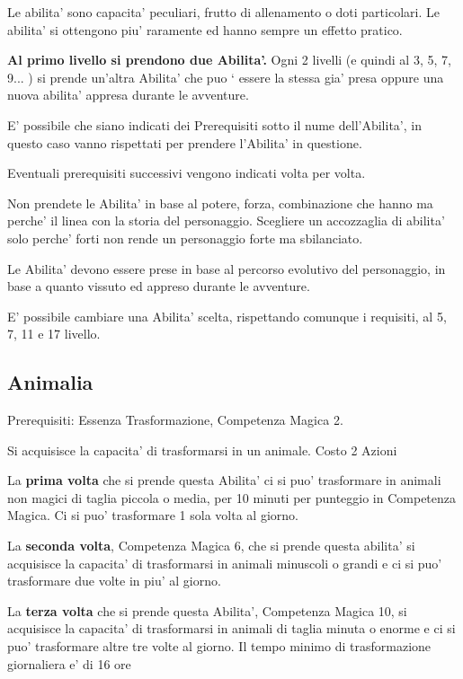 \documentclass[a4paper,11pt,twoside,openany]{book}
\begin{document}
Le abilita' sono capacita' peculiari, frutto di allenamento o doti particolari. Le abilita' si ottengono piu' raramente ed hanno sempre un effetto pratico.

\textbf{Al primo livello si prendono due Abilita'.} Ogni 2 livelli (e quindi al 3, 5, 7, 9... ) si prende un'altra Abilita' che puo ` essere la stessa gia' presa oppure una nuova abilita' appresa durante le avventure.

E' possibile che siano indicati dei Prerequisiti sotto il nume dell'Abilita', in questo caso vanno rispettati per prendere l'Abilita' in questione.

Eventuali prerequisiti successivi vengono indicati volta per volta.

Non prendete le Abilita' in base al potere, forza, combinazione che hanno ma perche' il linea con la storia del personaggio.
Scegliere un accozzaglia di abilita' solo perche' forti non rende un personaggio forte ma sbilanciato. 

\medskip
Le Abilita' devono essere prese in base al percorso evolutivo del personaggio, in base a quanto vissuto ed appreso durante le avventure.
\medskip

E' possibile cambiare una Abilita' scelta, rispettando comunque i requisiti, al 5, 7, 11 e 17 livello.

\subsection{Animalia}

Prerequisiti: Essenza Trasformazione, Competenza Magica 2.

Si acquisisce la capacita' di trasformarsi in un animale. Costo 2 Azioni

La \textbf{prima volta} che si prende questa Abilita' ci si puo' trasformare in animali non magici di taglia piccola o media, per 10 minuti per punteggio in Competenza Magica. Ci si puo' trasformare 1 sola volta al giorno.

La \textbf{seconda volta}, Competenza Magica 6, che si prende questa abilita' si acquisisce la capacita' di trasformarsi in animali minuscoli o grandi e ci si puo' trasformare due volte in piu' al giorno. 

La \textbf{terza volta} che si prende questa Abilita', Competenza Magica 10, si acquisisce la capacita' di trasformarsi in animali di taglia minuta o enorme e ci si puo' trasformare altre tre volte al giorno. Il tempo minimo di trasformazione giornaliera e' di 16 ore
\end{document}

